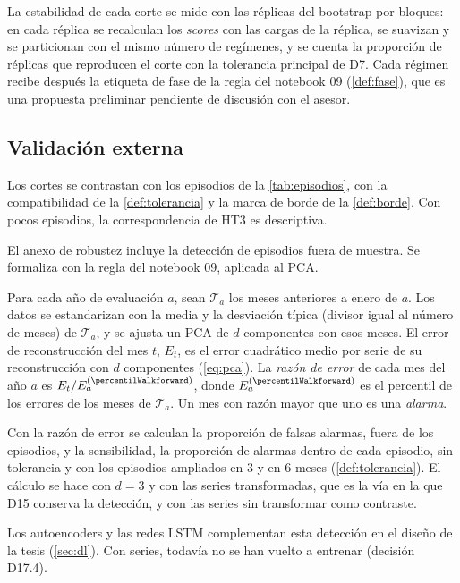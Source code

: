 La estabilidad de cada corte se mide con las réplicas del bootstrap por bloques: en cada réplica se
recalculan los \emph{scores} con las cargas de la réplica, se suavizan y se particionan con el mismo
número de regímenes, y se cuenta la proporción de réplicas que reproducen el corte con la tolerancia
principal de D7. Cada régimen recibe después la etiqueta de fase de la regla del notebook 09
(\cref{def:fase}), que es una propuesta preliminar pendiente de discusión con el asesor.

\subsection{Validación externa}
\label{sec:met-validacion}

Los cortes se contrastan con los episodios de la \cref{tab:episodios}, con la compatibilidad de la
\cref{def:tolerancia} y la marca de borde de la \cref{def:borde}. Con pocos episodios, la
correspondencia de HT3 es descriptiva.

El anexo de robustez incluye la detección de episodios fuera de muestra. Se formaliza con la regla
del notebook 09, aplicada al PCA.

\begin{definicion}\label{def:walkforward}
Para cada año de evaluación $a$, sean $\mathcal{T}_a$ los meses anteriores a enero de $a$. Los datos
se estandarizan con la media y la desviación típica (divisor igual al número de meses) de
$\mathcal{T}_a$, y se ajusta un PCA de $d$ componentes con esos meses. El error de reconstrucción
del mes $t$, $E_t$, es el error cuadrático medio por serie de su reconstrucción con $d$ componentes
(\cref{eq:pca}). La \emph{razón de error} de cada mes del año $a$ es $E_t/E^{(\percentilWalkforward)}_a$, donde
$E^{(\percentilWalkforward)}_a$ es el percentil \percentilWalkforward{} de los errores de los meses de $\mathcal{T}_a$. Un mes con razón
mayor que uno es una \emph{alarma}.
\end{definicion}

Con la razón de error se calculan la proporción de falsas alarmas, fuera de los episodios, y la
sensibilidad, la proporción de alarmas dentro de cada episodio, sin tolerancia y con los episodios
ampliados en 3 y en 6 meses (\cref{def:tolerancia}). El cálculo se hace con $d=3$ y con las series
transformadas, que es la vía en la que D15 conserva la detección, y con las series sin transformar
como contraste.

Los autoencoders y las redes LSTM complementan esta detección en el diseño de la tesis
(\cref{sec:dl}). Con \nSeries{} series, todavía no se han vuelto a entrenar (decisión D17.4).

